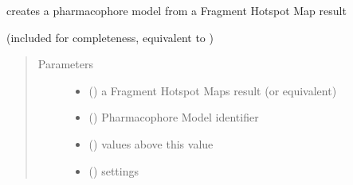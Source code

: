\documentclass[letterpaper,10pt,english]{sphinxmanual}
\begin{document}
\begin{fulllineitems}
\begin{fulllineitems}
\begin{quote}
\begin{description}
\begin{itemize}
\end{itemize}

\end{description}\end{quote}

\end{fulllineitems}


\begin{fulllineitems}
\label{\detokenize{hs_pharmacophore_api:hotspots.hs_pharmacophore.PharmacophoreModel.from_hotspot}}
creates a pharmacophore model from a Fragment Hotspot Map result

(included for completeness, equivalent to )
\begin{quote}\begin{description}
\item[{Parameters}] \leavevmode\begin{itemize}
\item {} 
 () \textendash{} a Fragment Hotspot Maps result (or equivalent)

\item {} 
 () \textendash{} Pharmacophore Model identifier

\item {} 
 () \textendash{} values above this value

\item {} 
 ({\hyperref[\detokenize{hs_pharmacophore_api:hotspots.hs_pharmacophore.PharmacophoreModel.Settings}]{}}) \textendash{} settings

\end{itemize}


\end{description}
\end{quote}
\end{fulllineitems}
\end{fulllineitems}
\end{document}
